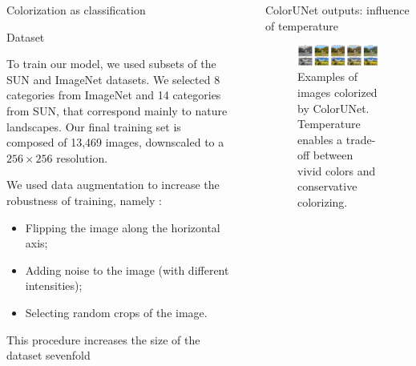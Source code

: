 \documentclass[final]{beamer}
\newlength{\sepwid}
\newlength{\onecolwid}
\newlength{\twocolwid}
\begin{document}
\begin{frame}[t]
\begin{columns}[t]
\begin{column}{\onecolwid}
\begin{block}{Colorization as classification}
\end{block}

\begin{block}{Dataset}

To train our model, we used subsets of the SUN and ImageNet datasets. We selected 8 categories from ImageNet and 14 categories from SUN, that correspond mainly to nature landscapes. Our final training set is composed of 13,469 images, downscaled to a $256\times 256$ resolution.

We used data augmentation to increase the robustness of training, namely :
\begin{itemize}
\item Flipping the image along the horizontal axis;
\item Adding noise to the image (with different intensities);
\item Selecting random crops of the image.
\end{itemize}
This procedure increases the size of the dataset sevenfold
\end{block}



\end{column} %




\begin{column}{\sepwid}\end{column} %


\begin{column}{\twocolwid} %

  \begin{block}{ColorUNet outputs: influence of temperature}

  \begin{figure}
  \begin{center}
  \includegraphics[width=.8\twocolwid]{img/good_cropped.png}
  \caption{Examples of images colorized by ColorUNet. Temperature enables a trade-off between vivid colors and conservative colorizing.}
  \label{good}
  \end{center}
  \end{figure}


\end{block}
\end{column}
\end{columns}
\end{frame}
\end{document}
